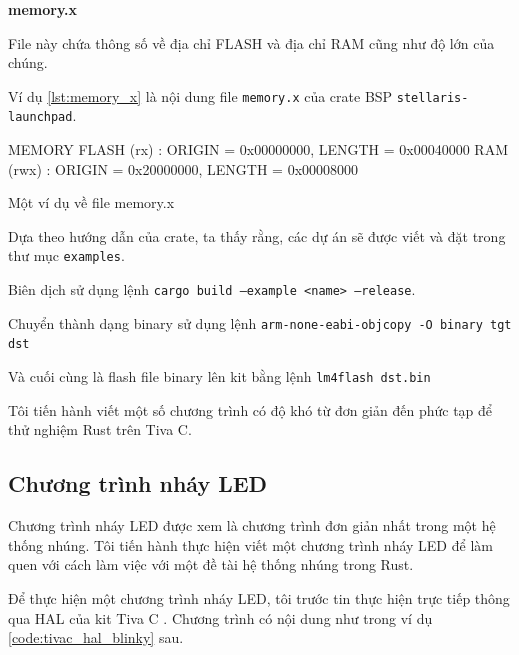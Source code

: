 \textbf{memory.x}

File này chứa thông số về địa chỉ FLASH và địa chỉ RAM cũng như độ lớn của chúng.

Ví dụ \ref{lst:memory_x} là nội dung file \texttt{memory.x} của crate BSP \texttt{stellaris-launchpad}.

\begin{listing}[ht]
\begin{plaintext}
MEMORY
{
    FLASH (rx) : ORIGIN = 0x00000000, LENGTH = 0x00040000
    RAM (rwx) : ORIGIN = 0x20000000, LENGTH = 0x00008000
}
\end{plaintext}
\caption{Một ví dụ về file memory.x}
\label{lst:memory_x}
\end{listing}

Dựa theo hướng dẫn của crate, ta thấy rằng, các dự án sẽ được viết và đặt trong thư mục \texttt{examples}.

Biên dịch sử dụng lệnh \texttt{cargo build --example <name> --release}.

Chuyển thành dạng binary sử dụng lệnh \texttt{arm-none-eabi-objcopy -O binary tgt dst}

Và cuối cùng là flash file binary lên kit bằng lệnh \texttt{lm4flash dst.bin}

Tôi tiến hành viết một số chương trình có độ khó từ đơn giản đến phức tạp để thử nghiệm Rust trên Tiva C.

\subsection{Chương trình nháy LED}\label{lbl:rust_blinky}
Chương trình nháy LED được xem là chương trình đơn giản nhất trong một hệ thống nhúng.
Tôi tiến hành thực hiện viết một chương trình nháy LED để làm quen với cách làm việc với một đề tài hệ thống nhúng trong Rust.

Để thực hiện một chương trình nháy LED, tôi trước tin thực hiện trực tiếp thông qua HAL của kit Tiva C \cite{tm4c_hal}.
Chương trình có nội dung như trong ví dụ \ref{code:tivac_hal_blinky} sau.

